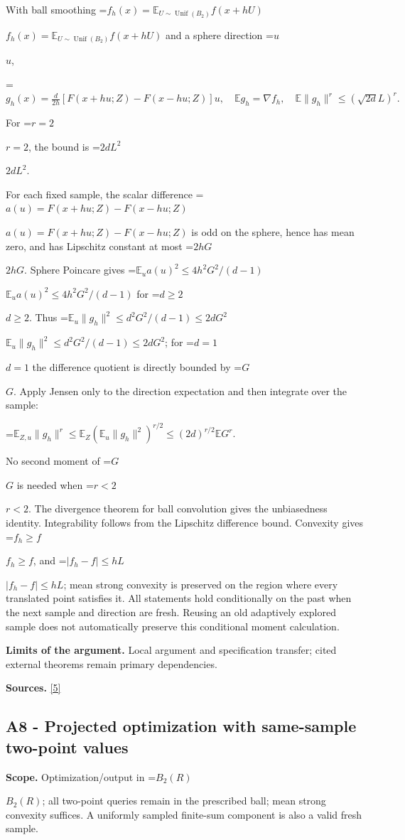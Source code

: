 \documentclass[10pt,a4paper]{article}
\newcommand{\AtlasMath}[1]{\par\begingroup\centering\setbox0=\hbox{$\displaystyle #1$}\ifdim\wd0>1.4\linewidth\typeout{ATLAS WIDE FORMULA: \the\wd0}\fi\ifdim\wd0>\linewidth\resizebox{\linewidth}{!}{\box0}\else\box0\fi\par\endgroup}
\newcommand{\AtlasInlineMath}[1]{\begingroup\setbox0=\hbox{$#1$}\ifdim\wd0>.4\linewidth\endgroup\AtlasMath{#1}\else\endgroup$#1$\fi}
\begin{document}
With ball smoothing \AtlasInlineMath{f_h(x)=\mathbb E_{U\sim\operatorname{Unif}(B_2)}f(x+hU)} and a sphere direction \AtlasInlineMath{u},

\AtlasMath{g_h(x)=\frac d{2h}[F(x+hu;Z)-F(x-hu;Z)]u,\quad\mathbb E g_h=\nabla f_h,\quad\mathbb E\|g_h\|^r\le(\sqrt{2d}L)^r.}

For \AtlasInlineMath{r=2}, the bound is \AtlasInlineMath{2dL^2}.

For each fixed sample, the scalar difference \AtlasInlineMath{a(u)=F(x+hu;Z)-F(x-hu;Z)} is odd on the sphere, hence has mean zero, and has Lipschitz constant at most \AtlasInlineMath{2hG}. Sphere Poincare gives \AtlasInlineMath{\mathbb E_u a(u)^2\le4h^2G^2/(d-1)} for \AtlasInlineMath{d\ge2}. Thus \AtlasInlineMath{\mathbb E_u\|g_h\|^2\le d^2G^2/(d-1)\le2dG^2}; for \AtlasInlineMath{d=1} the difference quotient is directly bounded by \AtlasInlineMath{G}. Apply Jensen only to the direction expectation and then integrate over the sample:

\AtlasMath{\mathbb E_{Z,u}\|g_h\|^r\le\mathbb E_Z(\mathbb E_u\|g_h\|^2)^{r/2}\le(2d)^{r/2}\mathbb E G^r.}

No second moment of \AtlasInlineMath{G} is needed when \AtlasInlineMath{r<2}. The divergence theorem for ball convolution gives the unbiasedness identity. Integrability follows from the Lipschitz difference bound. Convexity gives \AtlasInlineMath{f_h\ge f}, and \AtlasInlineMath{|f_h-f|\le hL}; mean strong convexity is preserved on the region where every translated point satisfies it. All statements hold conditionally on the past when the next sample and direction are fresh. Reusing an old adaptively explored sample does not automatically preserve this conditional moment calculation.

\textbf{Limits of the argument.} Local argument and specification transfer; cited external theorems remain primary dependencies.

\textbf{Sources.} \href{https://jmlr.org/papers/volume18/16-632/16-632.pdf}{[5]}

\subsection{A8 - Projected optimization with same-sample two-point values}
\textbf{Scope.} Optimization/output in \AtlasInlineMath{B_2(R)}; all two-point queries remain in the prescribed ball; mean strong convexity suffices. A uniformly sampled finite-sum component is also a valid fresh sample.
\end{document}
